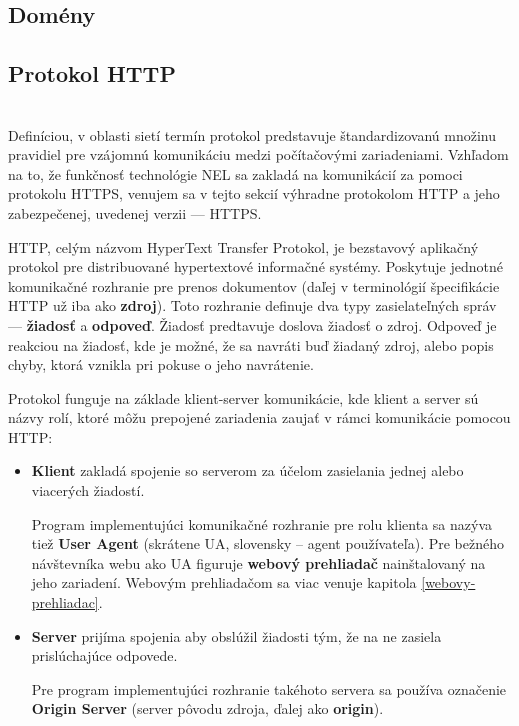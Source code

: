 \subsection{Domény}
\label{domeny}

\subsection{Protokol HTTP}
\\
Definíciou, v oblasti sietí termín protokol predstavuje štandardizovanú množinu pravidiel pre vzájomnú komunikáciu medzi počítačovými zariadeniami. %
Vzhľadom na to, že funkčnosť technológie NEL sa zakladá na komunikácií za pomoci protokolu HTTPS, %
venujem sa v tejto sekcií výhradne protokolom HTTP a jeho zabezpečenej, uvedenej verzii --- HTTPS. 

HTTP, celým názvom HyperText Transfer Protokol, je bezstavový aplikačný protokol pre distribuované hypertextové informačné systémy. 
Poskytuje jednotné komunikačné rozhranie pre prenos dokumentov (daľej v terminológií špecifikácie HTTP už iba ako \textbf{zdroj}).
Toto rozhranie definuje dva typy zasielateľných správ --- \textbf{žiadosť} a \textbf{odpoveď}. Žiadosť predtavuje doslova žiadosť o zdroj. Odpoveď je reakciou na žiadosť, kde je možné, že sa navráti buď žiadaný zdroj, alebo popis chyby, ktorá vznikla pri pokuse o jeho navrátenie. 

Protokol funguje na základe klient-server komunikácie, kde klient a server sú názvy rolí, ktoré môžu prepojené zariadenia zaujať v rámci komunikácie pomocou HTTP:
\begin{itemize}
    \item \textbf{Klient} zakladá spojenie so serverom za účelom zasielania jednej alebo viacerých \mbox{žiadostí}. 
    
    Program implementujúci komunikačné rozhranie pre rolu klienta sa nazýva tiež \textbf{User Agent} (skrátene UA, slovensky -- agent používateľa). Pre bežného návštevníka webu ako UA \mbox{figuruje} \textbf{webový prehliadač} nainštalovaný na jeho zariadení. Webovým prehliadačom sa viac venuje kapitola \ref{webovy-prehliadac}.
    
    \item \textbf{Server} prijíma spojenia aby obslúžil žiadosti tým, že na ne zasiela prislúchajúce odpovede.

    Pre program implementujúci rozhranie takéhoto servera sa používa označenie \textbf{Origin Server} (server pôvodu zdroja, ďalej ako \textbf{origin}).
    
\end{itemize}

